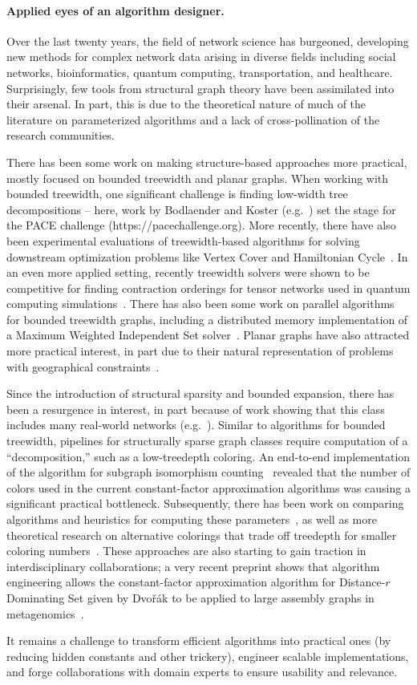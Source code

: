 \paragraph*{Applied eyes of an algorithm designer.}
Over the last twenty years, the field of network science
has burgeoned, developing new methods for complex network data arising
in diverse fields including social networks, bioinformatics, quantum computing,
transportation, and healthcare. Surprisingly, few tools from structural graph theory have been assimilated into
their arsenal. In part, this is due to the theoretical nature of
much of the literature on parameterized algorithms
and a lack of cross-pollination of the research communities.

There has been some work on making structure-based approaches more practical, mostly focused on
bounded treewidth and planar graphs. When working with bounded treewidth, one significant
challenge is finding low-width tree decompositions -- here, work by Bodlaender and Koster (e.g.~\cite{bodlaender2006-tw, koster2001-tw})
set the stage for the PACE challenge (https://pacechallenge.org). More recently, there have also been
experimental evaluations of treewidth-based algorithms for solving downstream optimization problems like
Vertex Cover and Hamiltonian Cycle~\cite{ziobro2018hamcycle-tw, alber2005vc-tw}. In an even more
applied setting, recently treewidth solvers were shown to be competitive for finding contraction orderings
for tensor networks used in quantum computing simulations~\cite{dumitrescu2018tensors}. There has also been some
work on parallel algorithms for bounded treewidth graphs, including a distributed memory implementation of a
Maximum Weighted Independent Set solver~\cite{sullivan2013paralleltd}.
Planar graphs have also attracted more practical interest, in part due to their natural representation of problems with geographical
constraints~\cite{alber2001-planar,schmidt2009-planarvision}.

Since the introduction of structural sparsity and bounded expansion,
there has been a resurgence in interest, in part because of work showing that
this class includes many real-world networks (e.g.~\cite{DemaineRRVSS14}).
Similar to algorithms for bounded treewidth, pipelines for structurally sparse graph classes
require computation of a ``decomposition,'' such as a low-treedepth coloring. An end-to-end implementation
of the algorithm for subgraph isomorphism counting~\cite{obrien2017concuss} revealed that the
number of colors used in the current constant-factor approximation algorithms was causing a significant
practical bottleneck. Subsequently, there has been work on comparing algorithms and heuristics
for computing these parameters~\cite{wojciech2018quasiwide}, as well as more theoretical research
on alternative colorings that trade off treedepth for smaller coloring numbers~\cite{kun2018lincolor}.
These approaches are also starting to gain traction in interdisciplinary collaborations; a very recent
preprint shows that algorithm engineering allows the constant-factor approximation algorithm
for Distance-$r$ Dominating Set given by Dvo\v{r}\'ak to be applied to large assembly graphs in metagenomics~\cite{brown2018metagenome}.

It remains a challenge to transform efficient algorithms into practical ones (by reducing hidden constants and other trickery),
engineer scalable implementations, and forge collaborations with domain experts to ensure usability and relevance.
